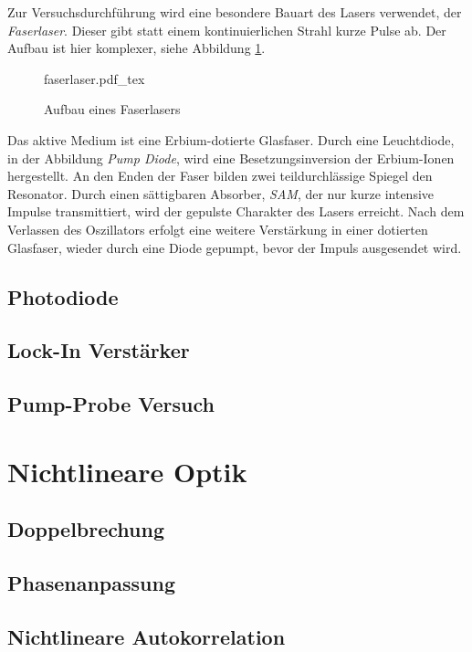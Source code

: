 Zur Versuchsdurchführung wird eine besondere Bauart des Lasers verwendet, der 
\emph{Faserlaser}. Dieser gibt statt einem kontinuierlichen Strahl kurze Pulse ab.
Der Aufbau ist hier komplexer, siehe Abbildung \ref{abb:faser}.
\begin{figure}[h]
  \centering
  {faserlaser.pdf_tex}
  \caption{Aufbau eines Faserlasers}
  \label{abb:faser}
\end{figure}
Das aktive Medium ist eine Erbium-dotierte Glasfaser. Durch eine Leuchtdiode, in der
Abbildung \emph{Pump Diode}, wird eine Besetzungsinversion der Erbium-Ionen
hergestellt. An den Enden der Faser bilden zwei teildurchlässige Spiegel den 
Resonator. Durch einen sättigbaren Absorber, \emph{SAM}, der nur kurze intensive
Impulse transmittiert, wird der gepulste Charakter des Lasers erreicht. Nach dem 
Verlassen des Oszillators erfolgt eine weitere Verstärkung in einer dotierten 
Glasfaser, wieder durch eine Diode gepumpt, bevor der Impuls ausgesendet wird. 
\autocite{phying, zinth}

    \subsection{Photodiode}


    \subsection{Lock-In Verstärker}


    \subsection{Pump-Probe Versuch}

\section{Nichtlineare Optik}
    \subsection{Doppelbrechung}

    \subsection{Phasenanpassung}

    \subsection{Nichtlineare Autokorrelation}

